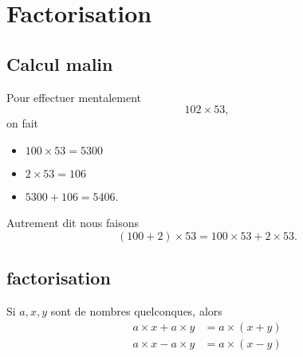 \section{Factorisation}



\subsection{Calcul malin}

Pour effectuer mentalement
\begin{equation}
    102\times 53,
\end{equation}
on fait
\begin{itemize}
    \item \( 100\times 53=5300\)
    \item \( 2\times 53=106\)
    \item \( 5300+106=5406\).
\end{itemize}
Autrement dit nous faisons
\begin{equation}
    (100+2)\times 53=100\times 53+2\times 53.
\end{equation}

\subsection{factorisation}

Si \( a,x,y\) sont de nombres quelconques, alors
\begin{subequations}
    \begin{align}
        a\times x+a\times y&=a\times (x+y)\\
        a\times x-a\times y&=a\times (x-y)
    \end{align}
\end{subequations}


